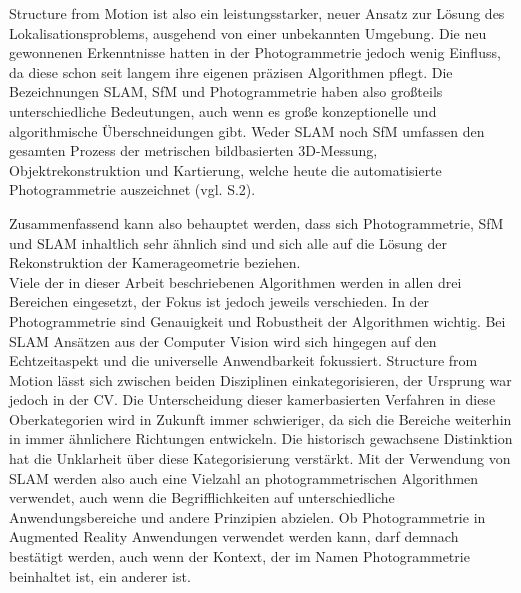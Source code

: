 Structure from Motion ist also ein leistungsstarker, neuer Ansatz zur Lösung des Lokalisationsproblems, ausgehend von einer unbekannten Umgebung. Die neu gewonnenen Erkenntnisse hatten in der Photogrammetrie jedoch wenig Einfluss, da diese schon seit langem ihre eigenen präzisen Algorithmen pflegt. Die Bezeichnungen SLAM, SfM und Photogrammetrie haben also großteils unterschiedliche Bedeutungen, auch wenn es große konzeptionelle und algorithmische Überschneidungen gibt. Weder SLAM noch SfM umfassen den gesamten Prozess der metrischen bildbasierten 3D-Messung, Objektrekonstruktion und Kartierung, welche heute die automatisierte Photogrammetrie auszeichnet (vgl. \cite{vergleich_fraser} S.2). 

Zusammenfassend kann also behauptet werden, dass sich Photogrammetrie, SfM und SLAM inhaltlich sehr ähnlich sind und sich alle auf die Lösung der Rekonstruktion der Kamerageometrie beziehen. \\ Viele der in dieser Arbeit beschriebenen Algorithmen werden in allen drei Bereichen eingesetzt, der Fokus ist jedoch jeweils verschieden. In der Photogrammetrie sind Genauigkeit und Robustheit der Algorithmen wichtig. Bei SLAM Ansätzen aus der Computer Vision wird sich hingegen auf den Echtzeitaspekt und die universelle Anwendbarkeit fokussiert. Structure from Motion lässt sich zwischen beiden Disziplinen einkategorisieren, der Ursprung war jedoch in der CV. Die Unterscheidung dieser kamerbasierten Verfahren in diese Oberkategorien wird in Zukunft immer schwieriger, da sich die Bereiche weiterhin in immer ähnlichere Richtungen entwickeln. Die historisch gewachsene Distinktion hat die Unklarheit über diese Kategorisierung verstärkt. Mit der Verwendung von SLAM werden also auch eine Vielzahl an photogrammetrischen Algorithmen verwendet, auch wenn die Begrifflichkeiten auf unterschiedliche Anwendungsbereiche und andere Prinzipien abzielen. Ob Photogrammetrie in Augmented Reality Anwendungen verwendet werden kann, darf demnach bestätigt werden, auch wenn der Kontext, der im Namen Photogrammetrie beinhaltet ist, ein anderer ist.


